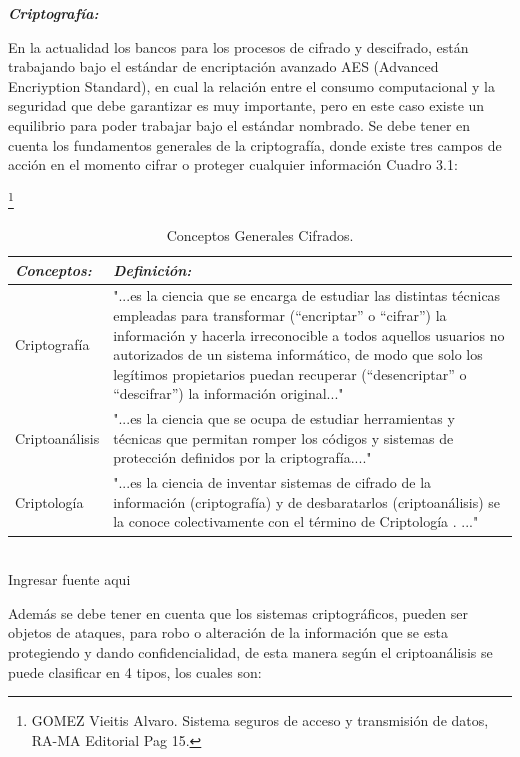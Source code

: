 \documentclass[a4paper,openright,12pt]{book}
\theoremstyle{definition}
\theoremstyle{remark}
\begin{document}
\textbf{\textit{Criptografía:}}

En la actualidad los bancos para los procesos de cifrado y descifrado, están trabajando bajo el estándar de encriptación avanzado AES (Advanced Encriyption Standard), en cual la relación entre el consumo computacional y la seguridad que debe garantizar es muy importante, pero en este caso existe un equilibrio para poder trabajar bajo el estándar nombrado. Se debe tener en cuenta los fundamentos generales de la criptografía, donde existe tres campos de acción en el momento cifrar o proteger cualquier información Cuadro 3.1: 

\begin{table}[htb]
\centering
\caption{Conceptos Generales Cifrados.}\footnote{GOMEZ Vieitis Alvaro. Sistema seguros de acceso y transmisión de datos, RA-MA Editorial Pag 15.}
\begin{tabular}{>{\centering\arraybackslash}m{3cm} >{\arraybackslash}m{9cm} }
\hline
\textbf{\textit{Conceptos:}} & \textbf{\textit{Definición:}} \\ \hline
Criptografía & "...es la ciencia que se encarga de estudiar las distintas técnicas empleadas para transformar (“encriptar” o “cifrar”) la información y hacerla irreconocible a todos aquellos usuarios no autorizados de un sistema informático, de modo que solo los legítimos propietarios puedan recuperar (“desencriptar” o “descifrar”) la información original..." \\ \hline
Criptoanálisis & "...es la ciencia que se ocupa de estudiar herramientas y técnicas que permitan romper los códigos y sistemas de protección definidos por la criptografía...." \\ \hline
Criptología & "...es la ciencia de inventar sistemas de cifrado de la información (criptografía) y de desbaratarlos (criptoanálisis) se la conoce colectivamente con el término de Criptología . ..." \\ \hline
\end{tabular}
\label{tabla:ConceptosCriptograficos}
\\Ingresar fuente aqui
\end{table}

Además se debe tener en cuenta que los sistemas criptográficos, pueden ser objetos de ataques, para robo o alteración de la información que se esta protegiendo y dando confidencialidad, de esta manera según el criptoanálisis se puede clasificar en 4 tipos, los cuales son:
\end{document}
